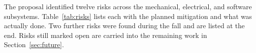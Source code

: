The proposal identified twelve risks across the mechanical, electrical, and
software subsystems. Table~\ref{tab:risks} lists each with the planned
mitigation and what was actually done. Two further risks were found during
the fall and are listed at the end. Risks still marked open are carried
into the remaining work in Section~\ref{sec:future}.